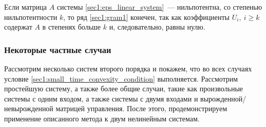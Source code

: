 \documentclass[../main.tex]{subfiles}
\begin{document}
Если матрица $ A $ системы \eqref{sec1:eps_linear_system}~--- нильпотентна, со степенью нильпотентности $ k $, то ряд \eqref{sec1:gram1} конечен, так как коэффициенты $ U_i, \ i \geq k$ содержат $ A $ в степенях больше $ k$ и, следовательно, равны нулю.
 
\subsubsection{Некоторые частные случаи}
Рассмотрим несколько систем второго порядка и покажем, что во всех случаях условие \eqref{sec1:small_time_convexity_condition} выполняется.
Рассмотрим простейшую систему, а также более общие случаи, такие как произвольные системы с одним входом, а также системы с двумя входами и вырожденной/невырожденной матрицей управления.
После этого, продемонстрируем применение описанного метода к двум нелинейным системам.
\end{document}
